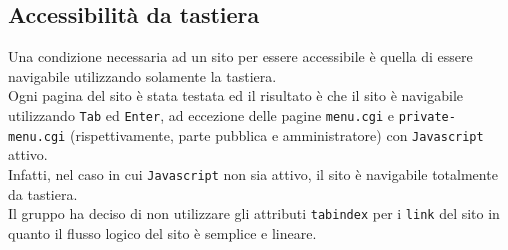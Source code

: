 \documentclass[../relazione.tex]{subfiles}
\begin{document}
	\subsection{Accessibilità da tastiera}
		Una condizione necessaria ad un sito per essere accessibile è quella di essere navigabile utilizzando solamente la tastiera.\\
		Ogni pagina del sito è stata testata ed il risultato è che il sito è navigabile utilizzando \texttt{Tab} ed \texttt{Enter}, ad eccezione delle pagine \texttt{menu.cgi} e \texttt{private-menu.cgi} (rispettivamente, parte pubblica e amministratore) con \texttt{Javascript} attivo.\\
		Infatti, nel caso in cui \texttt{Javascript} non sia attivo, il sito è navigabile totalmente da tastiera.\\
		Il gruppo ha deciso di non utilizzare gli attributi \texttt{tabindex} per i \texttt{link} del sito in quanto il flusso logico del sito è semplice e lineare.
	
\end{document}
